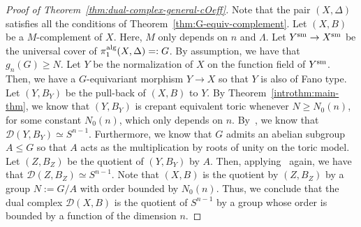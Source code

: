 \documentclass{amsart}
\theoremstyle{remark}
\numberwithin{equation}{section}
\begin{document}
\begin{proof}[Proof of Theorem~\ref{thm:dual-complex-general-cOeff}]
Note that the pair 
$(X,\Delta)$ satisfies all the conditions of Theorem~\ref{thm:G-equiv-complement}.
Let $(X,B)$ be a $M$-complement of $X$.
Here, $M$ only depends on $n$ and $\Lambda$.
Let $Y^{\rm sm}\rightarrow X^{\rm sm}$ 
be the universal cover of $\pi_1^{\rm alg}(X,\Delta)=:G$.
By assumption,
we have that
$g_n(G)\geq N$.
Let $Y$ be the normalization of $X$ on the function field of $Y^{\rm sm}$.
Then, we have a $G$-equivariant morphism $Y\rightarrow X$ so
that $Y$ is also of Fano type.
Let $(Y,B_Y)$ be the pull-back of $(X,B)$ to $Y$.
By Theorem~\ref{introthm:main-thm}, we know that $(Y,B_Y)$ is crepant equivalent  toric whenever $N \geq N_0(n)$,
for some constant $N_0(n)$, which only depends on $n$.
By~\cite{dFKX17}, we know that $\mathcal{D}(Y,B_Y)\simeq S^{n-1}$.
Furthermore, we know that $G$ admits an abelian subgroup $A\leqslant G$ so that $A$ acts as the multiplication by roots of unity on the toric model.
Let $(Z,B_Z)$ be the quotient of $(Y,B_Y)$ by $A$.
Then, applying~\cite{dFKX17} again, we have that
$\mathcal{D}(Z,B_Z)\simeq S^{n-1}$.
Note that $(X,B)$ is the quotient by $(Z,B_Z)$ by a group
$N:=G/A$
with order bounded by $N_0(n)$.
Thus, we conclude that the dual complex $\mathcal{D}(X,B)$
is the quotient of $S^{n-1}$ by a group whose order is bounded by a function of the dimension $n$.
\end{proof}
\end{document}
